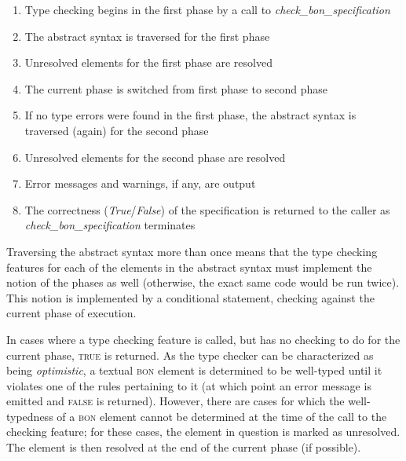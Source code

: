 \begin{enumerate}
\item Type checking begins in the first phase by a call to \textit{check\_bon\_specification}
\item The abstract syntax is traversed for the first phase
\item Unresolved elements for the first phase are resolved
\item The current phase is switched from first phase to second phase
\item If no type errors were found in the first phase, the abstract syntax is traversed (again) for the second phase
\item Unresolved elements for the second phase are resolved
\item Error messages and warnings, if any, are output
\item The correctness (\textit{True}/\textit{False}) of the specification is returned to the caller as \textit{check\_bon\_specification} terminates
\end{enumerate}

Traversing the abstract syntax more than once means that the type checking features for each of the elements in the abstract syntax must implement the notion of the phases as well (otherwise, the exact same code would be run twice). This notion is implemented by a conditional statement, checking against the current phase of execution.

In cases where a type checking feature is called, but has no checking to do for the current phase, \textsc{true} is returned. As the type checker can be characterized as being \textit{optimistic}, a textual \textsc{bon} element is determined to be well-typed until it violates one of the rules pertaining to it (at which point an error message is emitted and \textsc{false} is returned). However, there are cases for which the well-typedness of a \textsc{bon} element cannot be determined at the time of the call to the checking feature; for these cases, the element in question is marked as unresolved. The element is then resolved at the end of the current phase (if possible).
